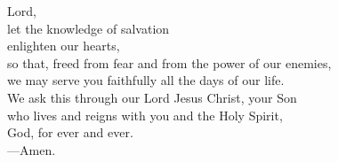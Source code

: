 \prayer


\begin{prayerverse}
Lord,\\
let the knowledge of salvation\\
enlighten our hearts,\\
so that, freed from fear and from the power of our enemies,\\
we may serve you faithfully all the days of our life.\\
We ask this through our Lord Jesus Christ, your Son\\
who lives and reigns with you and the Holy Spirit,\\
God, for ever and ever.\\
{\color{red}---\thinspace}Amen.
\end{prayerverse}

